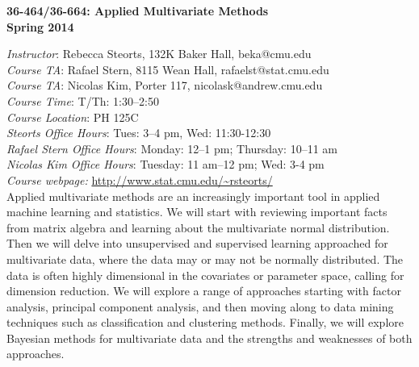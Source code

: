 \documentclass[11pt]{article}
\date{}
\begin{document}

\begin{center}
{\Large\bf 36-464/36-664: Applied Multivariate Methods} \\

{\Large\bf Spring 2014} \\
\end{center}

\emph{Instructor}: Rebecca Steorts, 132K Baker Hall, beka@cmu.edu\\
\emph{Course TA}: Rafael Stern, 8115 Wean Hall, rafaelst@stat.cmu.edu\\
\emph{Course TA}: Nicolas Kim, Porter 117, nicolask@andrew.cmu.edu\\
\emph{Course Time}: T/Th: 1:30--2:50\\
\emph{Course Location}: PH 125C		\\

\emph{Steorts Office Hours}: Tues: 3--4 pm, Wed: 11:30-12:30 \\
\emph{Rafael Stern Office Hours}:  Monday: 12--1 pm;  Thursday: 10--11 am\\
\emph{Nicolas Kim Office Hours}: Tuesday: 11 am--12 pm; Wed: 3-4 pm \\
\emph{Course webpage:} \url{http://www.stat.cmu.edu/\~rsteorts/} \\

Applied multivariate methods are an increasingly important tool
in applied machine learning and statistics. We will start with reviewing important 
facts from matrix algebra and learning about the multivariate normal distribution. Then
we will delve into unsupervised and supervised learning approached for multivariate data, 
where the data may or may not be normally distributed. The data is often highly dimensional
in the covariates or parameter space, calling for dimension reduction. We will explore a range of approaches
starting with factor analysis, principal component analysis, and then moving along to data mining techniques
such as classification and clustering methods. Finally, we will explore Bayesian methods for multivariate data
and the strengths and weaknesses of both approaches. \\
\end{document}
